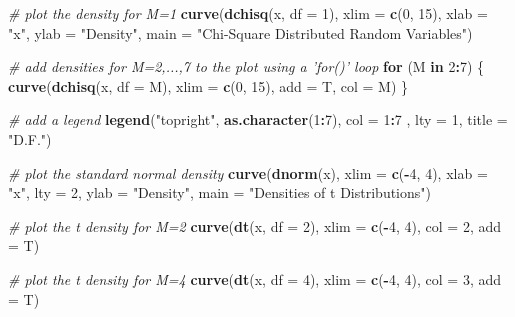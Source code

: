 \documentclass[
]{book}
\newenvironment{Shaded}{\begin{snugshade}}{\end{snugshade}}
\newcommand{\CommentTok}[1]{\textcolor[rgb]{0.56,0.35,0.01}{\textit{#1}}}
\newcommand{\ControlFlowTok}[1]{\textcolor[rgb]{0.13,0.29,0.53}{\textbf{#1}}}
\newcommand{\DataTypeTok}[1]{\textcolor[rgb]{0.13,0.29,0.53}{#1}}
\newcommand{\DecValTok}[1]{\textcolor[rgb]{0.00,0.00,0.81}{#1}}
\newcommand{\KeywordTok}[1]{\textcolor[rgb]{0.13,0.29,0.53}{\textbf{#1}}}
\newcommand{\NormalTok}[1]{#1}
\newcommand{\OperatorTok}[1]{\textcolor[rgb]{0.81,0.36,0.00}{\textbf{#1}}}
\newcommand{\StringTok}[1]{\textcolor[rgb]{0.31,0.60,0.02}{#1}}
\begin{document}
\begin{Shaded}
\begin{Highlighting}[]
\CommentTok{# plot the density for M=1}
\KeywordTok{curve}\NormalTok{(}\KeywordTok{dchisq}\NormalTok{(x, }\DataTypeTok{df =} \DecValTok{1}\NormalTok{), }
      \DataTypeTok{xlim =} \KeywordTok{c}\NormalTok{(}\DecValTok{0}\NormalTok{, }\DecValTok{15}\NormalTok{), }
      \DataTypeTok{xlab =} \StringTok{"x"}\NormalTok{, }
      \DataTypeTok{ylab =} \StringTok{"Density"}\NormalTok{, }
      \DataTypeTok{main =} \StringTok{"Chi-Square Distributed Random Variables"}\NormalTok{)}

\CommentTok{# add densities for M=2,...,7 to the plot using a 'for()' loop }
\ControlFlowTok{for}\NormalTok{ (M }\ControlFlowTok{in} \DecValTok{2}\OperatorTok{:}\DecValTok{7}\NormalTok{) \{}
  \KeywordTok{curve}\NormalTok{(}\KeywordTok{dchisq}\NormalTok{(x, }\DataTypeTok{df =}\NormalTok{ M),}
        \DataTypeTok{xlim =} \KeywordTok{c}\NormalTok{(}\DecValTok{0}\NormalTok{, }\DecValTok{15}\NormalTok{), }
        \DataTypeTok{add =}\NormalTok{ T, }
        \DataTypeTok{col =}\NormalTok{ M)}
\NormalTok{\}}

\CommentTok{# add a legend}
\KeywordTok{legend}\NormalTok{(}\StringTok{"topright"}\NormalTok{, }
       \KeywordTok{as.character}\NormalTok{(}\DecValTok{1}\OperatorTok{:}\DecValTok{7}\NormalTok{), }
       \DataTypeTok{col =} \DecValTok{1}\OperatorTok{:}\DecValTok{7}\NormalTok{ , }
       \DataTypeTok{lty =} \DecValTok{1}\NormalTok{, }
       \DataTypeTok{title =} \StringTok{"D.F."}\NormalTok{)}


\CommentTok{# plot the standard normal density}
\KeywordTok{curve}\NormalTok{(}\KeywordTok{dnorm}\NormalTok{(x), }
      \DataTypeTok{xlim =} \KeywordTok{c}\NormalTok{(}\OperatorTok{-}\DecValTok{4}\NormalTok{, }\DecValTok{4}\NormalTok{), }
      \DataTypeTok{xlab =} \StringTok{"x"}\NormalTok{, }
      \DataTypeTok{lty =} \DecValTok{2}\NormalTok{, }
      \DataTypeTok{ylab =} \StringTok{"Density"}\NormalTok{, }
      \DataTypeTok{main =} \StringTok{"Densities of t Distributions"}\NormalTok{)}

\CommentTok{# plot the t density for M=2}
\KeywordTok{curve}\NormalTok{(}\KeywordTok{dt}\NormalTok{(x, }\DataTypeTok{df =} \DecValTok{2}\NormalTok{), }
      \DataTypeTok{xlim =} \KeywordTok{c}\NormalTok{(}\OperatorTok{-}\DecValTok{4}\NormalTok{, }\DecValTok{4}\NormalTok{), }
      \DataTypeTok{col =} \DecValTok{2}\NormalTok{, }
      \DataTypeTok{add =}\NormalTok{ T)}

\CommentTok{# plot the t density for M=4}
\KeywordTok{curve}\NormalTok{(}\KeywordTok{dt}\NormalTok{(x, }\DataTypeTok{df =} \DecValTok{4}\NormalTok{), }
      \DataTypeTok{xlim =} \KeywordTok{c}\NormalTok{(}\OperatorTok{-}\DecValTok{4}\NormalTok{, }\DecValTok{4}\NormalTok{), }
      \DataTypeTok{col =} \DecValTok{3}\NormalTok{, }
      \DataTypeTok{add =}\NormalTok{ T)}


\end{Highlighting}
\end{Shaded}
\end{document}
